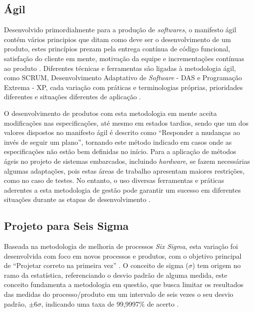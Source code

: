 
\subsection{Ágil}
Desenvolvido primordialmente para a produção de \textit{softwares}, o manifesto ágil contém vários principios que ditam como deve ser o desenvolvimento de um 
produto, estes princípios prezam pela entrega contínua de código funcional, satisfação do cliente em mente, motivação da equipe e incrementações contínuas 
ao produto \cite{beck2001manifesto}. Diferentes técnicas e ferramentas são ligadas à metodologia ágil, como SCRUM, Desenvolvimento Adaptativo de \textit{Software} - DAS e Programação 
Extrema - XP, cada variação com práticas e terminologias próprias, prioridades diferentes e situações diferentes de aplicação \cite{kaisti2013agile}. 

O desenvolvimento de produtos com esta metodologia em mente aceita modificações nas especificações, até mesmo em estados tardios, sendo que um dos valores 
dispostos no manifesto ágil \cite{beck2001manifesto} é descrito como ``Responder a mudanças ao invés de seguir um plano'', tornando este método indicado em casos
onde as especificações não estão bem definidas no início. Para a aplicação de métodos ágeis no projeto de sistemas embarcados, incluindo \textit{hardware}, se 
fazem necessárias algumas adaptações, pois estas áreas de trabalho apresentam maiores restrições, como no caso de testes. No entanto, o uso diversas 
ferramentas e práticas aderentes a esta metodologia de gestão pode garantir um sucesso em diferentes situações durante as etapas de desenvolvimento \cite{kaisti2013agile}.



\subsection{Projeto para Seis Sigma}
Baseada na metodologia de melhoria de processos \textit{Six Sigma}, esta variação foi desenvolvida com foco em novos processos e produtos, com o objetivo principal
de ``Projetar correto na primeira vez'' \cite{yang2003design}. O conceito de sigma ($\sigma$) tem origem no ramo da estatística, referenciando o desvio padrão
de alguma medida, este conceito fundamenta a metodologia em questão, que busca limitar os resultados das medidas do processo/produto em um intervalo de seis 
vezes o seu desvio padrão, $\pm6\sigma$, indicando uma taxa de 99,9997$\%$ de acerto \cite{pande2001six}.

